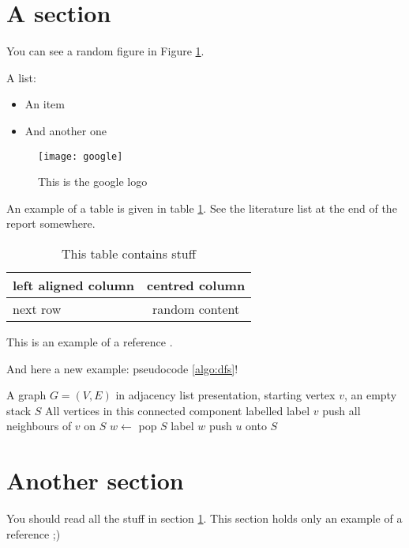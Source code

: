 \section{A section}
\label{sec:exampleA}

You can see a random figure in Figure \ref{fig:googlelogo}.

A list:
\begin{itemize}
\item An item
\item And another one
\end{itemize}

\begin{figure}[h]
\center
\texttt{[image: google]}
\caption{This is the google logo}
\label{fig:googlelogo}
\end{figure}


An example of a table is given in table \ref{tab:randomtable}. See the literature list at the end of the report somewhere.

\begin{table}[h]
\center
\begin{tabular}{|l|c|}\hline
left aligned column & centred column \\\hline
next row  & random content\\\hline
\end{tabular}
\caption{This table contains stuff}
\label{tab:randomtable}
\end{table}

This is an example of a reference \cite{becker}.

And here a new example: pseudocode \ref{algo:dfs}!
\begin{algorithm}
\caption{}
\label{algo:dfs}
\begin{algorithmic}[1]
\REQUIRE A graph $G=(V,E)$ in adjacency list presentation, starting vertex $v$, an empty stack $S$
\ENSURE All vertices in this connected component labelled
\STATE label $v$
\STATE push all neighbours of $v$ on $S$
	\STATE $w \leftarrow$ pop $S$
	\STATE label $w$
			\STATE push $u$ onto $S$
		\ENDIF
	\ENDFOR
\ENDWHILE
\end{algorithmic}
\end{algorithm}


\section{Another section}
You should read all the stuff in section \ref{sec:exampleA}. This section holds only an example of a reference ;)

